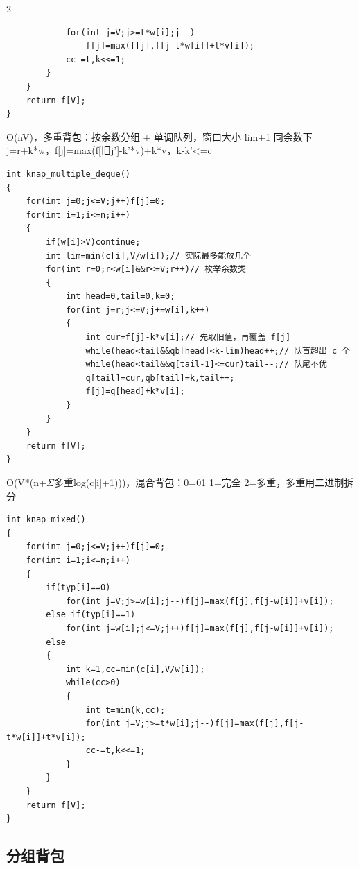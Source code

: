\documentclass[UTF8,fontset=fandol,a4paper,twoside]{ctexart}
\newcommand{\note}[1]{{\fontsize{10}{12}\selectfont #1\par}}
\begin{document}
\begin{multicols}{2}
\begin{lstlisting}
            for(int j=V;j>=t*w[i];j--)
                f[j]=max(f[j],f[j-t*w[i]]+t*v[i]);
            cc-=t,k<<=1;
        }
    }
    return f[V];
}
\end{lstlisting}
\note{O(\allowbreak{}nV)\allowbreak{}，多重背包：按余数分组 +\allowbreak{} 单调队列，窗口大小 lim+\allowbreak{}1 同余数下 j=\allowbreak{}r+\allowbreak{}k*w，f[\allowbreak{}j]\allowbreak{}=\allowbreak{}max(\allowbreak{}f[\allowbreak{}旧j']\allowbreak{}-\allowbreak{}k'*v)\allowbreak{}+\allowbreak{}k*v，k-\allowbreak{}k'<\allowbreak{}=\allowbreak{}c}
\begin{lstlisting}
int knap_multiple_deque()
{
    for(int j=0;j<=V;j++)f[j]=0;
    for(int i=1;i<=n;i++)
    {
        if(w[i]>V)continue;
        int lim=min(c[i],V/w[i]);// 实际最多能放几个
        for(int r=0;r<w[i]&&r<=V;r++)// 枚举余数类
        {
            int head=0,tail=0,k=0;
            for(int j=r;j<=V;j+=w[i],k++)
            {
                int cur=f[j]-k*v[i];// 先取旧值，再覆盖 f[j]
                while(head<tail&&qb[head]<k-lim)head++;// 队首超出 c 个
                while(head<tail&&q[tail-1]<=cur)tail--;// 队尾不优
                q[tail]=cur,qb[tail]=k,tail++;
                f[j]=q[head]+k*v[i];
            }
        }
    }
    return f[V];
}
\end{lstlisting}
\note{O(\allowbreak{}V*(\allowbreak{}n+\allowbreak{}\ensuremath{\Sigma}多重log(\allowbreak{}c[\allowbreak{}i]\allowbreak{}+\allowbreak{}1)\allowbreak{})\allowbreak{})\allowbreak{}，混合背包：0=\allowbreak{}01 1=\allowbreak{}完全 2=\allowbreak{}多重，多重用二进制拆分}
\begin{lstlisting}
int knap_mixed()
{
    for(int j=0;j<=V;j++)f[j]=0;
    for(int i=1;i<=n;i++)
    {
        if(typ[i]==0)
            for(int j=V;j>=w[i];j--)f[j]=max(f[j],f[j-w[i]]+v[i]);
        else if(typ[i]==1)
            for(int j=w[i];j<=V;j++)f[j]=max(f[j],f[j-w[i]]+v[i]);
        else
        {
            int k=1,cc=min(c[i],V/w[i]);
            while(cc>0)
            {
                int t=min(k,cc);
                for(int j=V;j>=t*w[i];j--)f[j]=max(f[j],f[j-t*w[i]]+t*v[i]);
                cc-=t,k<<=1;
            }
        }
    }
    return f[V];
}
\end{lstlisting}
\subsection{分组背包}


\end{multicols}
\end{document}
